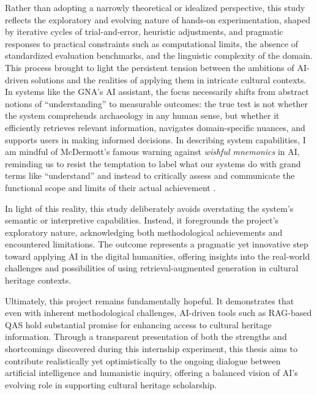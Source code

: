 \begin{spacing}{1.5}
Rather than adopting a narrowly theoretical or idealized perspective, this study reflects the exploratory and evolving nature of hands-on experimentation, shaped by iterative cycles of trial-and-error, heuristic adjustments, and pragmatic responses to practical constraints such as computational limits, the absence of standardized evaluation benchmarks, and the linguistic complexity of the domain. This process brought to light the persistent tension between the ambitions of AI-driven solutions and the realities of applying them in intricate cultural contexts. In systems like the GNA’s AI assistant, the focus necessarily shifts from abstract notions of “understanding” to measurable outcomes: the true test is not whether the system comprehends archaeology in any human sense, but whether it efficiently retrieves relevant information, navigates domain-specific nuances, and supports users in making informed decisions. In describing system capabilities, I am mindful of McDermott’s famous warning against \textit{wishful mnemonics} in AI, reminding us to resist the temptation to label what our systems do with grand terms like “understand” and instead to critically assess and communicate the functional scope and limits of their actual achievement \citep{mcdermott_artificial_1976}.

In light of this reality, this study deliberately avoids overstating the system’s semantic or interpretive capabilities. Instead, it foregrounds the project’s exploratory nature, acknowledging both methodological achievements and encountered limitations. The outcome represents a pragmatic yet innovative step toward applying AI in the digital humanities, offering insights into the real-world challenges and possibilities of using retrieval-augmented generation in cultural heritage contexts.

Ultimately, this project remains fundamentally hopeful. It demonstrates that even with inherent methodological challenges, AI-driven tools such as RAG-based QAS hold substantial promise for enhancing access to cultural heritage information. Through a transparent presentation of both the strengths and shortcomings discovered during this internship experiment, this thesis aims to contribute realistically yet optimistically to the ongoing dialogue between artificial intelligence and humanistic inquiry, offering a balanced vision of AI’s evolving role in supporting cultural heritage scholarship.

\end{spacing}